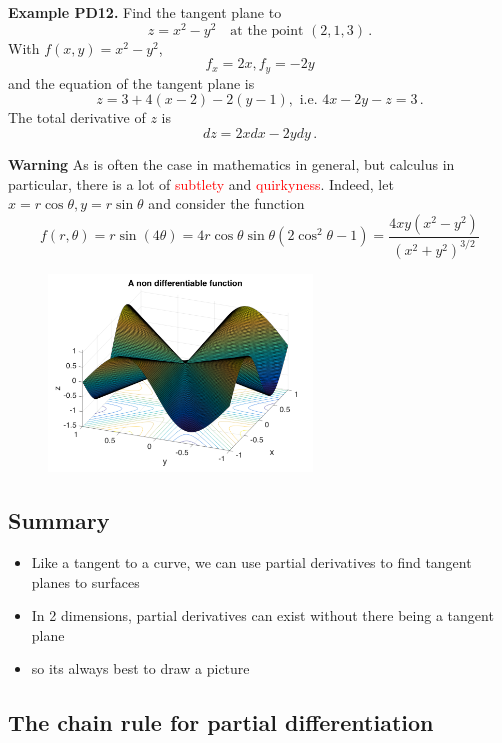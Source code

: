 \documentclass{article}
\begin{document}
\textbf{Example PD12.} Find the tangent plane to
$$
z = x^2 - y^2 \quad \mbox{at the point } (2,1,3)\,.
$$
With $f(x,y) = x^2 - y^2$,
$$
f_x = 2x, f_y = -2y
$$
and the equation of the tangent plane is
$$
z = 3 + 4(x-2) - 2 (y-1), \mbox{ i.e. } 4x - 2 y - z = 3\,.
$$
The total derivative of $z$ is
$$
dz = 2x dx - 2y dy\,.
$$



\textbf{Warning} As is often the case in mathematics in general, but calculus in particular,
there is a lot of \textcolor{red}{subtlety} and \textcolor{red}{quirkyness}. Indeed, let $x = r \cos \theta, y = r \sin \theta$ and consider the function
$$
f(r,\theta) = r \sin (4 \theta) = 4 r \cos \theta \sin \theta \left( 2 \cos^2 \theta - 1 \right) = \frac{4 xy (x^2 - y^2)}{(x^2 + y^2)^{3/2}}
$$
\begin{figure}%
\vspace{-.2cm}
\includegraphics[width = 7cm]{paraumbloid.pdf}%

\end{figure}


\subsection{Summary}

\begin{itemize}
\item
Like a tangent to a curve, we can use partial derivatives to find tangent planes to surfaces
\item
In 2 dimensions, partial derivatives can exist without there being a tangent plane
\item
so its always best to draw a picture
\end{itemize}


\subsection{The chain rule for partial differentiation}
\end{document}
